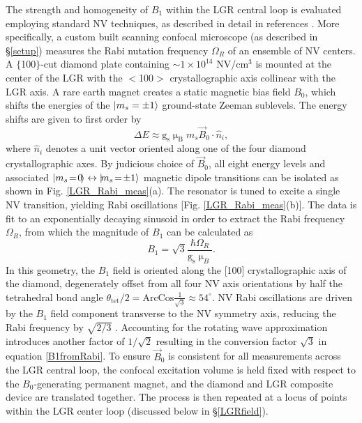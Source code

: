 The strength and homogeneity of $B_1$ within the LGR central loop is evaluated employing standard NV techniques, as described in detail in references \cite{pham2013magnetic,childressthesis2011coherent,mazethesis2010quantum}. More specifically, a custom built scanning confocal microscope (as described in \S \ref{setup}) measures the Rabi nutation frequency $\Omega_R$ of an ensemble of NV centers. A $\{$100$\}$-cut diamond plate containing $\sim 1 \times 10^{14}$ NV/cm$^3$ is mounted at the center of the LGR with the $<$100$>$ crystallographic axis collinear with the LGR axis. A rare earth magnet creates a static magnetic bias field $B_0$, which shifts the energies of the $\ket{m_s=\pm1}$ ground-state Zeeman sublevels. The energy shifts are given to first order by~\cite{taylor2008high}
\begin{equation}
\Delta E \approx \text{g}_{\text{s}} \upmu_\text{B} m_s \vec{B}_0\cdot \hat{n}_i,
\end{equation}
where $\hat{n}_i$ denotes a unit vector oriented along one of the four diamond crystallographic axes. By judicious choice of $\vec{B}_0$, all eight energy levels and associated $\ket{m_s\!=\!0\!} \leftrightarrow \ket{\!m_s\! =\!\pm1}$ magnetic dipole transitions can be isolated as shown in Fig. \ref{LGR_Rabi_meas}(a). The resonator is tuned to excite a single NV transition, yielding Rabi oscillations [Fig. \ref{LGR_Rabi_meas}(b)]. The data is fit to an exponentially decaying sinusoid in order to extract the Rabi frequency $\Omega_R$, from which the magnitude of $B_1$ can be calculated as
\begin{equation}\label{B1fromRabi}
B_1 = \sqrt{3}\frac{\hbar \Omega_R}{\text{g}_{\text{s}} \upmu_{B}}.
\end{equation} 
In this geometry, the $B_1$ field is oriented along the [100] crystallographic axis of the diamond, degenerately offset from all four NV axis orientations by half the tetrahedral bond angle $\theta_{\text{tet}}/2 = \text{ArcCos}\frac{1}{\sqrt{3}} \approx 54^\circ$. NV Rabi oscillations are driven by the $B_1$ field component transverse to the NV symmetry axis, reducing the Rabi frequency by $\sqrt{2/3}$ \cite{sasaki2016broadband}. Accounting for the rotating wave approximation introduces another factor of $1/\sqrt{2}$ resulting in the conversion factor $\sqrt{3}$ in equation \ref{B1fromRabi}. To ensure $\vec{B}_0$ is consistent for all measurements across the LGR central loop, the confocal excitation volume is held fixed with respect to the $B_0$-generating permanent magnet, and the diamond and LGR composite device are translated together. The process is then repeated at a locus of points within the LGR center loop (discussed below in \S \ref{LGRfield}).

